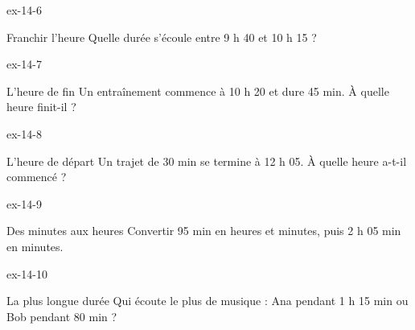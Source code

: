 \begin{blocLivre}{ex-14-6}\begin{exercice}[2]{Franchir l’heure}
Quelle durée s’écoule entre 9 h 40 et 10 h 15 ?
\end{exercice}\end{blocLivre}
\begin{blocLivre}{ex-14-7}\begin{exercice}[2]{L’heure de fin}
Un entraînement commence à 10 h 20 et dure 45 min. À quelle heure finit-il ?
\end{exercice}\end{blocLivre}
\begin{blocLivre}{ex-14-8}\begin{exercice}[2]{L’heure de départ}
Un trajet de 30 min se termine à 12 h 05. À quelle heure a-t-il commencé ?
\end{exercice}\end{blocLivre}
\begin{blocLivre}{ex-14-9}\begin{exercice}[2]{Des minutes aux heures}
Convertir 95 min en heures et minutes, puis 2 h 05 min en minutes.
\end{exercice}\end{blocLivre}
\begin{blocLivre}{ex-14-10}\begin{exercice}[2]{La plus longue durée}
Qui écoute le plus de musique : Ana pendant 1 h 15 min ou Bob pendant 80 min ?
\end{exercice}\end{blocLivre}

